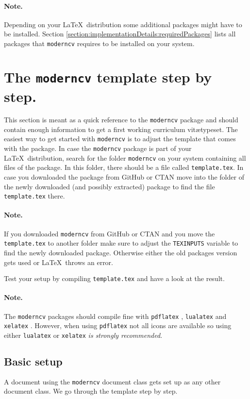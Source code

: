 \documentclass[a4paper,11pt]{article}
\newcommand{\code}[1]{\lstinline!#1!}
\newcommand{\Code}[1]{\lstinline!#1! } %
\newcommand{\Moderncv}{\Code{moderncv}}
\newcommand{\Github}{GitHub }
\newcommand{\Ctan}{CTAN }
\newcommand{\cvtemplate}{\code{template.tex}}
\newcommand{\Cvtemplate}{\code{template.tex} }
\begin{document}
\paragraph{Note.} Depending on your \LaTeX\ distribution some additional packages might have to be installed. 
Section \ref{section:implementationDetails:requiredPackages} lists all packages that \Moderncv requires to be installed on your system. 

\section{The \texttt{moderncv} template step by step.}
This section is meant as a quick reference to the \Moderncv package and should contain enough information 
to get a first working curriculum vit\ae typeset. 
\label{section:moderncvTemplate}
The easiest way to get started with \Moderncv is to adjust the template that comes with the package.
In case the \Moderncv package is part of your \LaTeX\ distribution, search for the folder \Moderncv 
on your system containing all files of the package. 
In this folder, there should be a file called \cvtemplate. 
In case you downloaded the package from \Github or \Ctan move into the folder of the newly downloaded (and possibly extracted) package to 
find the file \Cvtemplate there. 

\paragraph{Note.} If you downloaded \Moderncv from \Github or \Ctan and you move the \Cvtemplate to another folder make sure to adjust the \Code{TEXINPUTS} variable to find the newly downloaded package. 
Otherwise either the old packages version gets used or \LaTeX\ throws an error.

Test your setup by compiling \Cvtemplate and have a look at the result. 

\paragraph{Note.} The \Moderncv packages should compile fine with \Code{pdflatex}, \Code{lualatex} and \Code{xelatex}. However, when using \Code{pdflatex} not all icons are available so using either 
\Code{lualatex} or \Code{xelatex} \emph{is strongly recommended}.

\subsection{Basic setup}
A document using the \Moderncv document class gets set up as any other document class. We go through the template step by step.
\end{document}
